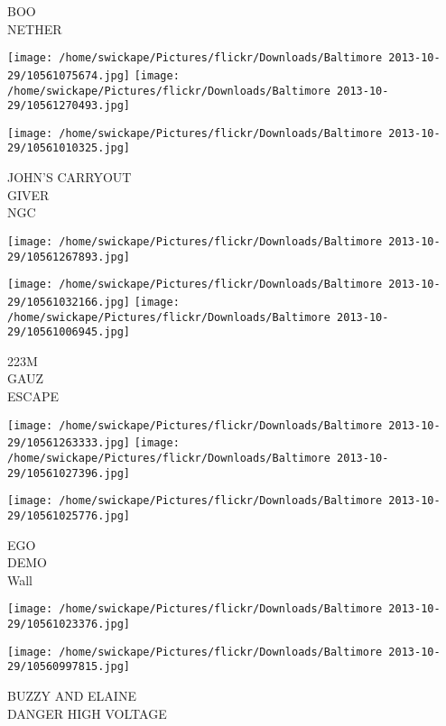 \documentclass[10pt,letterpaper]{article}
\begin{document}
BOO\\
NETHER\\
\pagebreak

\texttt{[image: /home/swickape/Pictures/flickr/Downloads/Baltimore 2013-10-29/10561075674.jpg]}
\texttt{[image: /home/swickape/Pictures/flickr/Downloads/Baltimore 2013-10-29/10561270493.jpg]}

\texttt{[image: /home/swickape/Pictures/flickr/Downloads/Baltimore 2013-10-29/10561010325.jpg]}

JOHN'S CARRYOUT\\
GIVER\\
NGC\\
\pagebreak

\texttt{[image: /home/swickape/Pictures/flickr/Downloads/Baltimore 2013-10-29/10561267893.jpg]}

\vspace{0.25in}
\texttt{[image: /home/swickape/Pictures/flickr/Downloads/Baltimore 2013-10-29/10561032166.jpg]}
\texttt{[image: /home/swickape/Pictures/flickr/Downloads/Baltimore 2013-10-29/10561006945.jpg]}

223M\\
GAUZ\\
ESCAPE\\
\pagebreak

\texttt{[image: /home/swickape/Pictures/flickr/Downloads/Baltimore 2013-10-29/10561263333.jpg]}
\texttt{[image: /home/swickape/Pictures/flickr/Downloads/Baltimore 2013-10-29/10561027396.jpg]}

\vspace{0.25in}
\texttt{[image: /home/swickape/Pictures/flickr/Downloads/Baltimore 2013-10-29/10561025776.jpg]}

EGO\\
DEMO\\
Wall\\
\pagebreak

\texttt{[image: /home/swickape/Pictures/flickr/Downloads/Baltimore 2013-10-29/10561023376.jpg]}

\vspace{0.25in}
\texttt{[image: /home/swickape/Pictures/flickr/Downloads/Baltimore 2013-10-29/10560997815.jpg]}

BUZZY AND ELAINE\\
DANGER HIGH VOLTAGE\\
\pagebreak
\end{document}
